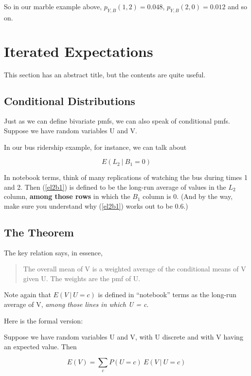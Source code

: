 So in our marble example above, $p_{Y,B}(1,2) = 0.048$, $p_{Y,B}(2,0) =
0.012$ and so on.

\section{Iterated Expectations}
\label{iterexp}

This section has an abstract title, but the contents are quite useful.

\subsection{Conditional Distributions}

Just as we can define bivariate pmfs, we can also speak of conditional
pmfs.  Suppose we have random variables U and V.  

In our bus ridership example, for instance, we can talk about

\begin{equation}
\label{el2b1}
E(L_2 ~|~ B_1 = 0) 
\end{equation}

In notebook terms, think of many replications of watching the bus during
times 1 and 2.  Then (\ref{el2b1}) is defined to be the long-run average
of values in the $L_2$ column, {\bf among those rows} in which the $B_1$
column is 0.  (And by the way, make sure you understand why
(\ref{el2b1}) works out to be 0.6.)

\subsection{The Theorem}

The key relation says, in essence,

\begin{quote}
The overall mean of V is a weighted average of the conditional means of
V given U.  The weights are the pmf of U.
\end{quote}

Note again that $E(V ~|~ U = c)$ is defined in ``notebook'' terms as the
long-run average of V, {\it among those lines in which U = c}.

Here is the formal version:

Suppose we have random variables U and V, with U discrete and with V
having  an expected value.  Then

\begin{equation}
\label{adamsdiscrete}
E(V) = \sum_c P(U = c) ~ E(V ~|~ U = c) 
\end{equation}

